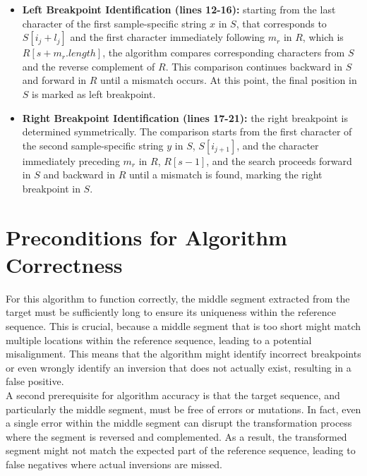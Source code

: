 \begin{itemize}
    \begin{itemize}
    	\item \textbf{Left Breakpoint Identification (lines 12-16):} starting from the last character of the first sample-specific string \( x \) in \( S \), that corresponds to \( S[i_j + l_j] \) and the first character immediately following \( m_r \) in \( R \), which is \( R[s + m_r .length] \), the algorithm compares corresponding characters from \( S \) and the reverse complement of \( R \). This comparison continues backward in \( S \) and forward in \( R \) until a mismatch occurs. At this point, the final position in \( S \) is marked as left breakpoint.
    	\item \textbf{Right Breakpoint Identification (lines 17-21):} the right breakpoint is determined symmetrically. The comparison starts from the first character of the second sample-specific string \( y \) in \( S \), \( S[i_{j+1}] \), and the character immediately preceding \( m_r \) in \( R \), \( R[s - 1] \), and the search proceeds forward in \( S \) and backward in \( R \) until a mismatch is found, marking the right breakpoint in \( S \). 
    \end{itemize}
\end{itemize}




\section{Preconditions for Algorithm Correctness}

For this algorithm to function correctly, the middle segment extracted from the target must be sufficiently long to ensure its uniqueness within the reference sequence. This is crucial, because a middle segment that is too short might match multiple locations within the reference sequence, leading to a potential misalignment. This means that the algorithm might identify incorrect breakpoints or even wrongly identify an inversion that does not actually exist, resulting in a false positive. \\
A second prerequisite for algorithm accuracy is that the target sequence, and particularly the middle segment, must be free of errors or mutations. In fact, even a single error within the middle segment can disrupt the transformation process where the segment is reversed and complemented. As a result, the transformed segment might not match the expected part of the reference sequence, leading to false negatives where actual inversions are missed. 

